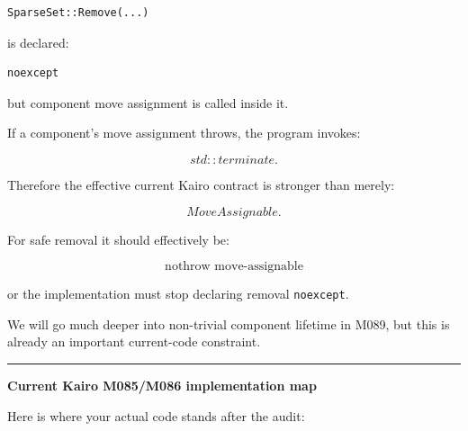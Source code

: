 \begin{verbatim}
SparseSet::Remove(...)
\end{verbatim}

is declared:

\begin{verbatim}
noexcept
\end{verbatim}

but component move assignment is called inside it.

If a component's move assignment throws, the program invokes:

\[
std::terminate.
\]

Therefore the effective current Kairo contract is stronger than merely:

\[
MoveAssignable.
\]

For safe removal it should effectively be:

\[
\boxed{
\text{nothrow move-assignable}
}
\]

or the implementation must stop declaring removal \texttt{noexcept}.

We will go much deeper into non-trivial component lifetime in M089, but this is already an important current-code constraint.

\begin{center}\rule{0.5\linewidth}{0.5pt}\end{center}

\textbf{Current Kairo M085/M086 implementation map}

Here is where your actual code stands after the audit:

